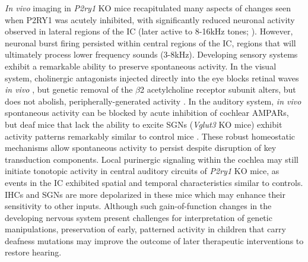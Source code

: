 \documentclass[9pt,lineno]{elife}
\begin{document}
\textit{In vivo} imaging in \textit{P2ry1} KO mice recapitulated many aspects of changes seen when P2RY1 was acutely inhibited, with significantly reduced neuronal activity observed in lateral regions of the IC (later active to 8-16kHz tones; ). However, neuronal burst firing persisted within central regions of the IC, regions that will ultimately process lower frequency sounds (3-8kHz). Developing sensory systems exhibit a remarkable ability to preserve spontaneous activity. In the visual system, cholinergic antagonists injected directly into the eye blocks retinal waves \textit{in vivo} \citep{Ackman2012}, but genetic removal of the $ \beta $2 acetylcholine receptor subunit alters, but does not abolish, peripherally-generated activity \citep{Zhang2012}. In the auditory system, \textit{in vivo} spontaneous activity can be blocked by acute inhibition of cochlear AMPARs, but deaf mice that lack the ability to excite SGNs (\textit{Vglut3} KO mice) exhibit activity patterns remarkably similar to control mice \citep{Babola2018}. These robust homeostatic mechanisms allow spontaneous activity to persist despite disruption of key transduction components. Local purinergic signaling within the cochlea may still initiate tonotopic activity in central auditory circuits of \textit{P2ry1} KO mice, as events in the IC exhibited spatial and temporal characteristics similar to controls. IHCs and SGNs are more depolarized in these mice which may enhance their sensitivity to other inputs. Although such gain-of-function changes in the developing nervous system present challenges for interpretation of genetic manipulations, preservation of early, patterned activity in children that carry deafness mutations may improve the outcome of later therapeutic interventions to restore hearing. 
\end{document}
